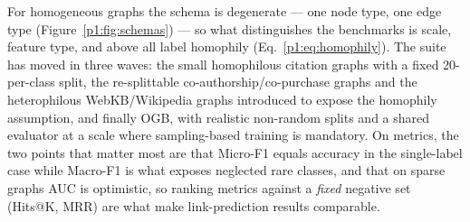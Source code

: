 For homogeneous graphs the schema is degenerate --- one node type, one edge type
(Figure~\ref{p1:fig:schemas}) --- so what distinguishes the benchmarks is scale, feature
type, and above all label homophily (Eq.~\eqref{p1:eq:homophily}). The suite has moved in
three waves: the small homophilous citation graphs with a fixed 20-per-class split, the
re-splittable co-authorship/co-purchase graphs and the heterophilous WebKB/Wikipedia graphs
introduced to expose the homophily assumption, and finally OGB, with realistic non-random
splits and a shared evaluator at a scale where sampling-based training is mandatory. On
metrics, the two points that matter most are that Micro-F1 equals accuracy in the
single-label case while Macro-F1 is what exposes neglected rare classes, and that on sparse
graphs AUC is optimistic, so ranking metrics against a \emph{fixed} negative set (Hits@K,
MRR) are what make link-prediction results comparable.
